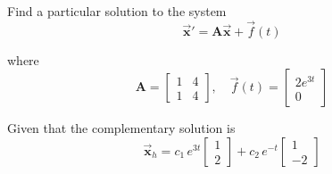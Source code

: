 \begin{example}
    Find a particular solution to the system
    \begin{equation*}
        \overrightarrow{\mathbf{x}}' = \mathbf{A}\overrightarrow{\mathbf{x}} + \overrightarrow{f}(t) 
    \end{equation*}
    
    where 
    \[
        \mathbf{A} = \begin{bmatrix}
            1 & 4\\ 1 & 4
        \end{bmatrix}, \quad 
        \overrightarrow{f}(t) = \begin{bmatrix}
            2e^{3t} \\ 0
        \end{bmatrix}
    \]

    Given that the complementary solution is 
    \[
        \overrightarrow{\mathbf{x}}_h = c_1\, e^{3t} \begin{bmatrix}
            1 \\ 2
        \end{bmatrix} + c_2\, e^{-t} \begin{bmatrix}
            1 \\ -2
        \end{bmatrix}
    \]
\end{example}
